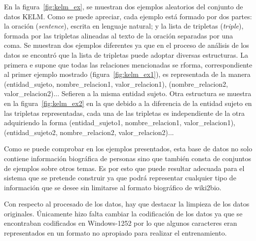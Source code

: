 En la figura~\ref{fig:kelm_ex}, se muestran dos ejemplos aleatorios del conjunto de datos KELM. Como se puede apreciar, cada ejemplo está formado por dos partes: la oración (\textit{sentence}), escrita en lenguaje natural; y la lista de tripletas (\textit{triple}), formada por las tripletas alineadas al texto de la oración separadas por una coma. Se muestran dos ejemplos diferentes ya que en el proceso de análisis de los datos se encontró que la lista de tripletas puede adoptar diversas estructuras. La primera e supone que todas las relaciones mencionadas se rforma, correspondiente al primer ejemplo mostrado (figura~\ref{fig:kelm_ex1}), es representada de la manera (entidad\_sujeto, nombre\_relacion1, valor\_relacion1), (nombre\_relacion2, valor\_relacion2)... Sefieren a la misma entidad sujeto. Otra estructura se muestra en la figura~\ref{fig:kelm_ex2} en la que debido a la diferencia de la entidad sujeto en las tripletas representadas, cada una de las tripletas es independiente de la otra adquiriendo la forma (entidad\_sujeto1, nombre\_relacion1, valor\_relacion1), (entidad\_sujeto2, nombre\_relacion2, valor\_relacion2)...

Como se puede comprobar en los ejemplos presentados, esta base de datos no solo contiene información  biográfica de personas sino que también consta de conjuntos de ejemplos sobre otros temas. Es por esto que puede resultar adecuada para el sistema que se pretende construir ya que podrá representar cualquier tipo de información que se desee sin limitarse al formato biográfico de wiki2bio.





Con respecto al procesado de los datos, hay que destacar la limpieza de los datos originales. Únicamente hizo falta cambiar la codificación de los datos ya que se encontraban codificados en Windows-1252 por lo que algunos caracteres eran representados en un formato no apropiado para realizar el entrenamiento.